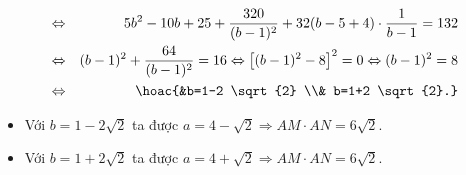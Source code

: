 \begin{ex}
{\begin{itemize}
\begin{eqnarray*}
				\\&\Leftrightarrow& 5 b^2-10 b+25+\dfrac{320}{(b-1)^2}+32(b-5+4) \cdot \dfrac{1}{b-1}=132 \\&\Leftrightarrow&(b-1)^2+\dfrac{64}{(b-1)^2}=16
				\Leftrightarrow\left[(b-1)^2-8\right]^2=0 \Leftrightarrow(b-1)^2=8 \\&\Leftrightarrow&\hoac{&b=1-2 \sqrt{2} \\& b=1+2 \sqrt{2}.}
			\end{eqnarray*}
			\begin{itemize}
				\item Với $b=1-2 \sqrt{2}$ ta được $a=4-\sqrt{2} \Rightarrow A M \cdot A N=6 \sqrt{2}$.
				\item Với $b=1+2 \sqrt{2}$ ta được $a=4+\sqrt{2} \Rightarrow A M \cdot  A N=6 \sqrt{2}$.
			\end{itemize}
		\end{itemize}
}\end{ex}

